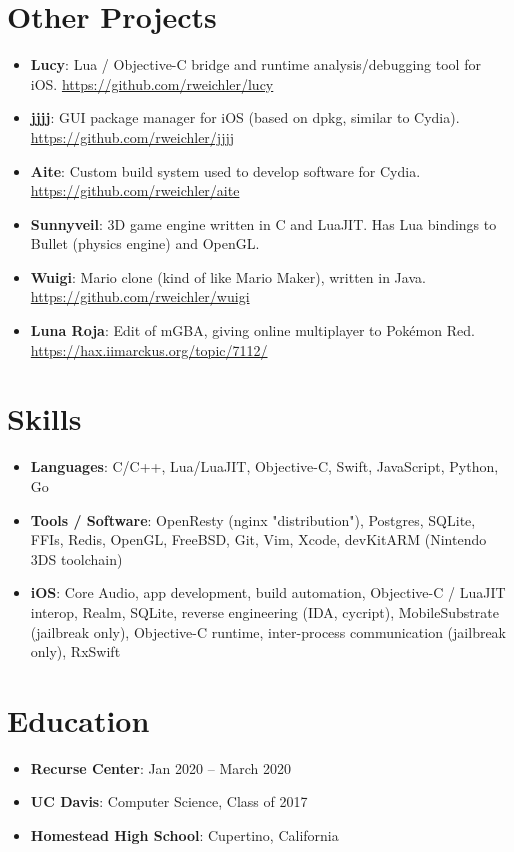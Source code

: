 \documentclass[letterpaper,11pt]{article}
\newcommand{\resumeItem}[2]{
  \item\small{
    \textbf{#1}{: #2 \vspace{-2.5pt}}
  }
}
\newcommand{\resumeItemAIDS}[2]{
  \item\small{
    \textbf{#1}{: #2 \vspace{-6.5pt}}
  }
}
\newcommand{\resumeSubItem}[2]{\resumeItem{#1}{#2}\vspace{-4pt}}
\newcommand{\resumeSubHeadingListStart}{\begin{itemize}[leftmargin=*]}
\newcommand{\resumeSubHeadingListEnd}{\end{itemize}}
\newcommand{\resumeItemListStart}{\begin{itemize}}
\newcommand{\resumeItemListEnd}{\end{itemize}\vspace{-5pt}}
\begin{document}
\section{Other Projects}
  \resumeSubHeadingListStart
    \resumeSubItem{Lucy}
      {Lua / Objective-C bridge and runtime analysis/debugging tool for iOS. \href{https://github.com/rweichler/lucy}{https://github.com/rweichler/lucy}}
    \resumeSubItem{jjjj}
      {GUI package manager for iOS (based on dpkg, similar to Cydia).  \href{https://github.com/rweichler/jjjj}{https://github.com/rweichler/jjjj}}
    \resumeSubItem{Aite}
      {Custom build system used to develop software for Cydia. \href{https://github.com/rweichler/aite}{https://github.com/rweichler/aite}}
    \resumeSubItem{Sunnyveil}
      {3D game engine written in C and LuaJIT. Has Lua bindings to Bullet (physics engine) and OpenGL.}
    \resumeSubItem{Wuigi}
      {Mario clone (kind of like Mario Maker), written in Java. \href{https://github.com/rweichler/wuigi}{https://github.com/rweichler/wuigi}}
    \resumeSubItem{Luna Roja}
      {Edit of mGBA, giving online multiplayer to Pok\'emon Red.  \href{https://hax.iimarckus.org/topic/7112/}{https://hax.iimarckus.org/topic/7112/}}
  \resumeSubHeadingListEnd

  
\section{Skills}
    \resumeItemListStart
        \resumeItemAIDS{Languages}
            {C/C++, Lua/LuaJIT, Objective-C, Swift, JavaScript, Python, Go}
        \resumeItemAIDS{Tools / Software}
            {OpenResty (nginx "distribution"), Postgres, SQLite, FFIs, Redis, OpenGL, FreeBSD, Git, Vim, Xcode, devKitARM (Nintendo 3DS toolchain)}
        \resumeItemAIDS{iOS}
            {Core Audio, app development, build automation, Objective-C / LuaJIT interop, Realm, SQLite, reverse engineering (IDA, cycript), MobileSubstrate (jailbreak only), Objective-C runtime, inter-process communication (jailbreak only), RxSwift}
    \resumeItemListEnd


\section{Education}
  \resumeSubHeadingListStart
    \resumeSubItem
      {Recurse Center}{Jan 2020 -- March 2020}
    \resumeSubItem
      {UC Davis}{Computer Science, Class of 2017}
    \resumeSubItem
      {Homestead High School}{Cupertino, California}
  \resumeSubHeadingListEnd
\end{document}
